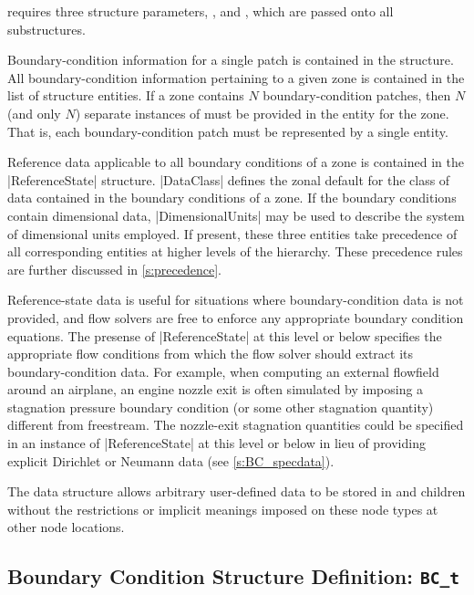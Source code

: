  requires three structure parameters, ,
 and , which are passed
onto all  substructures.

Boundary-condition information for a single patch is contained in the
 structure.
All boundary-condition information pertaining to a given zone is
contained in the list of  structure entities.
If a zone contains $N$ boundary-condition patches, then $N$ (and
only $N$) separate instances of  must be provided in the
 entity for the zone.
That is, each boundary-condition patch must be represented by a single
 entity.

Reference data applicable to all boundary conditions of a zone is
contained in the |ReferenceState| structure.  |DataClass| defines the
zonal default for the class of data contained in the boundary conditions
of a zone.  If the boundary conditions contain dimensional data,
|DimensionalUnits| may be used to describe the system of dimensional
units employed.  If present, these three entities take precedence of
all corresponding entities at higher levels of the hierarchy.  These
precedence rules are further discussed in \autoref{s:precedence}.

Reference-state data is useful for situations where boundary-condition
data is not provided, and flow solvers are free to enforce any
appropriate boundary condition equations.  The presense of
|ReferenceState| at this level or below specifies the appropriate
flow conditions from which the flow solver should extract its
boundary-condition data.
For example, when computing an external flowfield around an airplane, an
engine nozzle exit is often simulated by imposing a stagnation pressure
boundary condition (or some other stagnation quantity) different from
freestream.
The nozzle-exit
stagnation quantities could be specified in an instance of
|ReferenceState| at this level or below in lieu of providing explicit
Dirichlet or Neumann data (see \autoref{s:BC_specdata}).

The  data structure allows arbitrary
user-defined data to be stored in  and
 children without the restrictions or implicit
meanings imposed on these node types at other node locations.

\subsection{Boundary Condition Structure Definition: \texttt{BC\_t}}
\label{s:BCdefn}

